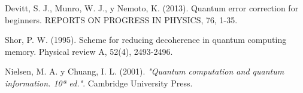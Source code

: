 \begin{thebibliography}{a}

	 Devitt, S. J., Munro, W. J., y Nemoto, K. (2013). Quantum error correction for beginners.
	REPORTS ON
	PROGRESS IN PHYSICS, 76, 1-35.
 
	 Shor, P. W. (1995). Scheme for reducing decoherence in quantum computing memory.
	Physical
	review
	A, 52(4),	2493-2496.

	 Nielsen, M. A. y Chuang, I. L. (2001). \textit{"Quantum computation and quantum
	information. 10ª ed."}. Cambridge University Press.

\end{thebibliography}
%
%